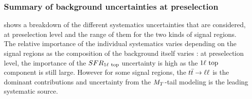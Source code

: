             \subsubsection{Summary of background uncertainties at preselection}

             shows a breakdown of the different systematics
            uncertainties that are considered, at preselection level and the range of them
            for the two kinds of signal regions. The relative importance of the individual
            systematics varies depending on the signal regions as the composition of the
            background itself varies : at preselection level, the importance of the
            $SFR_{1\ell~\text{top}}$ uncertainty is high as the $1\ell~\text{top}$ component is still large.
            However for some signal regions, the $t\bar{t} \rightarrow \ell \ell$ is the dominant contributions and
            uncertainty from the $M_T$-tail modeling is the leading systematic source.


